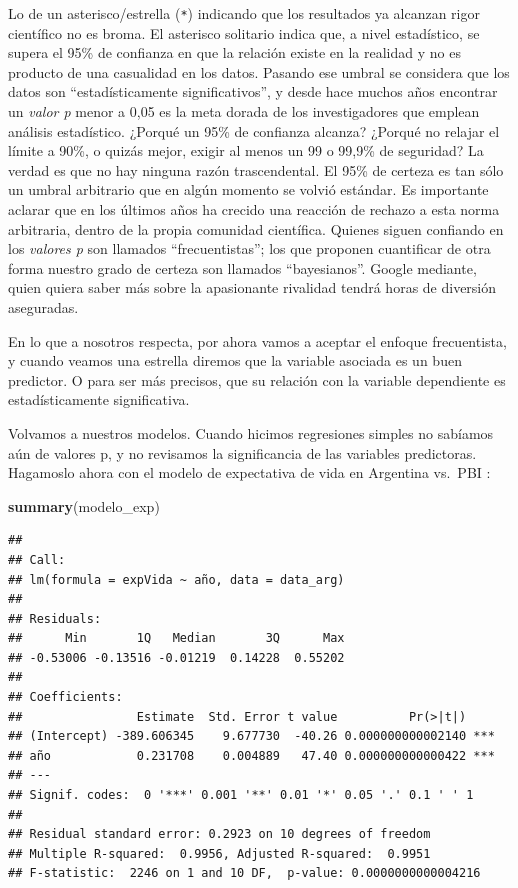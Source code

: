 \documentclass[spanish,]{book}
\newenvironment{Shaded}{\begin{snugshade}}{\end{snugshade}}
\newcommand{\KeywordTok}[1]{\textcolor[rgb]{0.13,0.29,0.53}{\textbf{#1}}}
\newcommand{\NormalTok}[1]{#1}
\begin{document}
Lo de un asterisco/estrella (\texttt{*}) indicando que los resultados ya alcanzan rigor científico no es broma. El asterisco solitario indica que, a nivel estadístico, se supera el 95\% de confianza en que la relación existe en la realidad y no es producto de una casualidad en los datos. Pasando ese umbral se considera que los datos son ``estadísticamente significativos'', y desde hace muchos años encontrar un \emph{valor p} menor a 0,05 es la meta dorada de los investigadores que emplean análisis estadístico. ¿Porqué un 95\% de confianza alcanza? ¿Porqué no relajar el límite a 90\%, o quizás mejor, exigir al menos un 99 o 99,9\% de seguridad? La verdad es que no hay ninguna razón trascendental. El 95\% de certeza es tan sólo un umbral arbitrario que en algún momento se volvió estándar. Es importante aclarar que en los últimos años ha crecido una reacción de rechazo a esta norma arbitraria, dentro de la propia comunidad científica. Quienes siguen confiando en los \emph{valores p} son llamados ``frecuentistas''; los que proponen cuantificar de otra forma nuestro grado de certeza son llamados ``bayesianos''. Google mediante, quien quiera saber más sobre la apasionante rivalidad tendrá horas de diversión aseguradas.

En lo que a nosotros respecta, por ahora vamos a aceptar el enfoque frecuentista, y cuando veamos una estrella diremos que la variable asociada es un buen predictor. O para ser más precisos, que su relación con la variable dependiente es estadísticamente significativa.

Volvamos a nuestros modelos. Cuando hicimos regresiones simples no sabíamos aún de valores p, y no revisamos la significancia de las variables predictoras. Hagamoslo ahora con el modelo de expectativa de vida en Argentina vs.~PBI :

\begin{Shaded}
\begin{Highlighting}[]
\KeywordTok{summary}\NormalTok{(modelo_exp)}
\end{Highlighting}
\end{Shaded}

\begin{verbatim}
## 
## Call:
## lm(formula = expVida ~ año, data = data_arg)
## 
## Residuals:
##      Min       1Q   Median       3Q      Max 
## -0.53006 -0.13516 -0.01219  0.14228  0.55202 
## 
## Coefficients:
##                Estimate  Std. Error t value          Pr(>|t|)    
## (Intercept) -389.606345    9.677730  -40.26 0.000000000002140 ***
## año            0.231708    0.004889   47.40 0.000000000000422 ***
## ---
## Signif. codes:  0 '***' 0.001 '**' 0.01 '*' 0.05 '.' 0.1 ' ' 1
## 
## Residual standard error: 0.2923 on 10 degrees of freedom
## Multiple R-squared:  0.9956, Adjusted R-squared:  0.9951 
## F-statistic:  2246 on 1 and 10 DF,  p-value: 0.0000000000004216
\end{verbatim}
\end{document}
